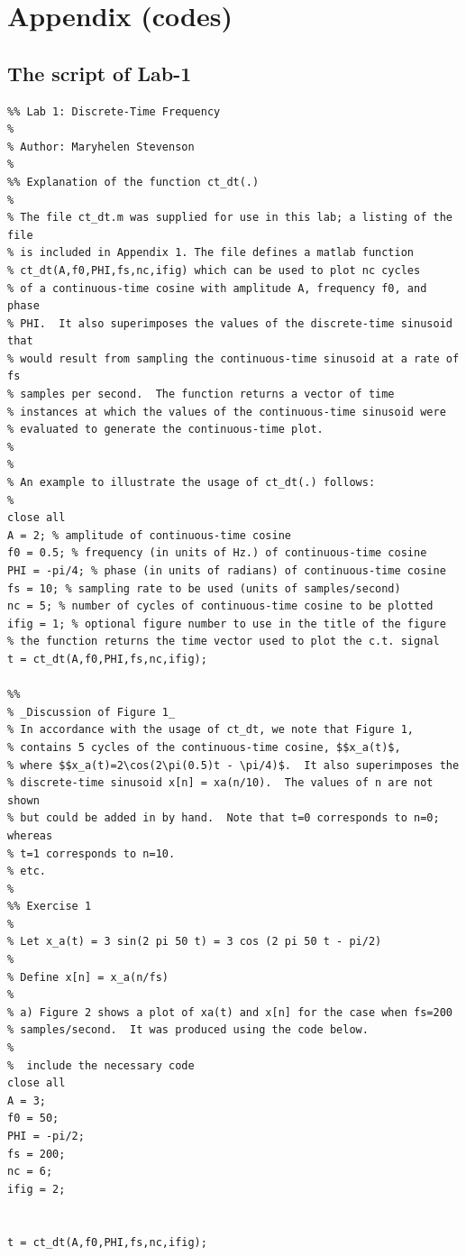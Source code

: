 \documentclass[12pt]{article}
\begin{document}
\newpage
\section{Appendix (codes)}
\subsection{The script of Lab-1}

\begin{lstlisting}
%% Lab 1: Discrete-Time Frequency
% 
% Author: Maryhelen Stevenson
%
%% Explanation of the function ct_dt(.)
%
% The file ct_dt.m was supplied for use in this lab; a listing of the file
% is included in Appendix 1. The file defines a matlab function
% ct_dt(A,f0,PHI,fs,nc,ifig) which can be used to plot nc cycles
% of a continuous-time cosine with amplitude A, frequency f0, and phase
% PHI.  It also superimposes the values of the discrete-time sinusoid that
% would result from sampling the continuous-time sinusoid at a rate of fs
% samples per second.  The function returns a vector of time
% instances at which the values of the continuous-time sinusoid were
% evaluated to generate the continuous-time plot.
% 
% 
% An example to illustrate the usage of ct_dt(.) follows: 
%
close all
A = 2; % amplitude of continuous-time cosine
f0 = 0.5; % frequency (in units of Hz.) of continuous-time cosine
PHI = -pi/4; % phase (in units of radians) of continuous-time cosine
fs = 10; % sampling rate to be used (units of samples/second)
nc = 5; % number of cycles of continuous-time cosine to be plotted
ifig = 1; % optional figure number to use in the title of the figure
% the function returns the time vector used to plot the c.t. signal
t = ct_dt(A,f0,PHI,fs,nc,ifig); 

%%
% _Discussion of Figure 1_
% In accordance with the usage of ct_dt, we note that Figure 1,
% contains 5 cycles of the continuous-time cosine, $$x_a(t)$,
% where $$x_a(t)=2\cos(2\pi(0.5)t - \pi/4)$.  It also superimposes the 
% discrete-time sinusoid x[n] = xa(n/10).  The values of n are not shown
% but could be added in by hand.  Note that t=0 corresponds to n=0; whereas
% t=1 corresponds to n=10.
% etc.
% 
%% Exercise 1
%  
% Let x_a(t) = 3 sin(2 pi 50 t) = 3 cos (2 pi 50 t - pi/2)
% 
% Define x[n] = x_a(n/fs)
%
% a) Figure 2 shows a plot of xa(t) and x[n] for the case when fs=200
% samples/second.  It was produced using the code below.
% 
%  include the necessary code
close all
A = 3; 
f0 = 50; 
PHI = -pi/2; 
fs = 200; 
nc = 6;
ifig = 2; 


t = ct_dt(A,f0,PHI,fs,nc,ifig); 



\end{lstlisting}
\end{document}
